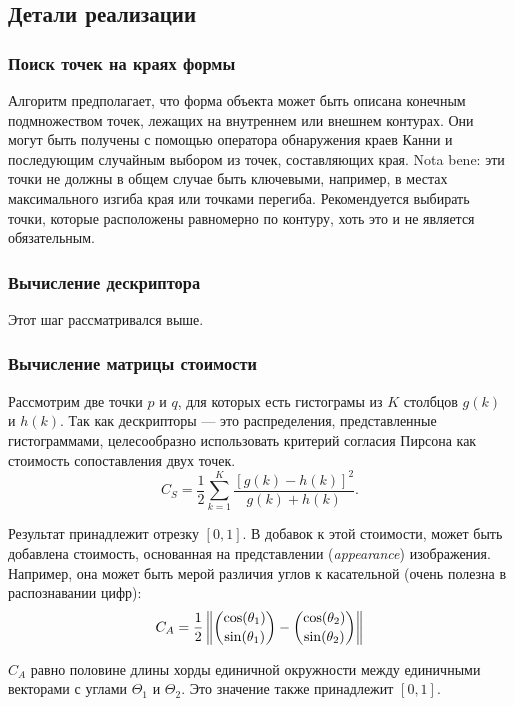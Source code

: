 \subsection{Детали реализации}
\subsubsection{Поиск точек на краях формы}
Алгоритм предполагает, что форма объекта может быть описана конечным подмножеством точек, лежащих на внутреннем или внешнем контурах. Они могут быть получены с помощью оператора обнаружения краев Канни и последующим случайным выбором из точек, составляющих края. Nota bene: эти точки не должны в общем случае быть ключевыми, например, в местах максимального изгиба края или точками перегиба. Рекомендуется выбирать точки, которые расположены равномерно по контуру, хоть это и не является обязательным.

\subsubsection{Вычисление дескриптора}
Этот шаг рассматривался выше.

\subsubsection{Вычисление матрицы стоимости}
Рассмотрим две точки $p$ и $q$, для которых есть гистограмы из $K$ столбцов $g(k)$ и $h(k)$. Так как дескрипторы --- это распределения, представленные гистограммами, целесообразно использовать критерий согласия Пирсона как стоимость сопоставления двух точек.
\begin{displaymath}
  C_S = \frac{1}{2}\sum_{k = 1}^{K}{\frac{[g(k) - h(k)]^2}{g(k) + h(k)}}.
\end{displaymath}

Результат принадлежит отрезку $[0,1]$. В добавок к этой стоимости, может быть добавлена стоимость, основанная на представлении (\emph{appearance}) изображения. Например, она может быть мерой различия углов к касательной (очень полезна в распознавании цифр):
\begin{displaymath}
  C_A = \frac{1}{2}
  \begin{Vmatrix}
    \dbinom{\cos(\theta_1)}{\sin(\theta_1)} - \dbinom{\cos(\theta_2)}{\sin(\theta_2)}
  \end{Vmatrix}
\end{displaymath}

$C_A$ равно половине длины хорды единичной окружности между единичными векторами с углами $\Theta_1$ и $\Theta_2$. Это значение также принадлежит $[0, 1]$.

